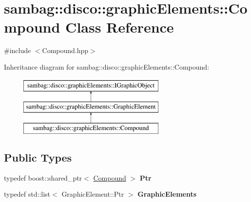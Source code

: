 \hypertarget{classsambag_1_1disco_1_1graphic_elements_1_1_compound}{
\section{sambag::disco::graphicElements::Compound Class Reference}
\label{classsambag_1_1disco_1_1graphic_elements_1_1_compound}
}


{\ttfamily \#include $<$Compound.hpp$>$}

Inheritance diagram for sambag::disco::graphicElements::Compound:\begin{figure}[H]
\begin{center}
\leavevmode
\includegraphics[height=3.000000cm]{classsambag_1_1disco_1_1graphic_elements_1_1_compound}
\end{center}
\end{figure}
\subsection*{Public Types}
\begin{DoxyCompactItemize}
\item 
\hypertarget{classsambag_1_1disco_1_1graphic_elements_1_1_compound_af349c4293a7d91edb8dc755ed50c1e9f}{
typedef boost::shared\_\-ptr$<$ \hyperlink{classsambag_1_1disco_1_1graphic_elements_1_1_compound}{Compound} $>$ {\bfseries Ptr}}
\label{classsambag_1_1disco_1_1graphic_elements_1_1_compound_af349c4293a7d91edb8dc755ed50c1e9f}

\item 
\hypertarget{classsambag_1_1disco_1_1graphic_elements_1_1_compound_a201169180198d1eee0893649d8ba77fa}{
typedef std::list$<$ GraphicElement::Ptr $>$ {\bfseries GraphicElements}}
\label{classsambag_1_1disco_1_1graphic_elements_1_1_compound_a201169180198d1eee0893649d8ba77fa}

\end{DoxyCompactItemize}
